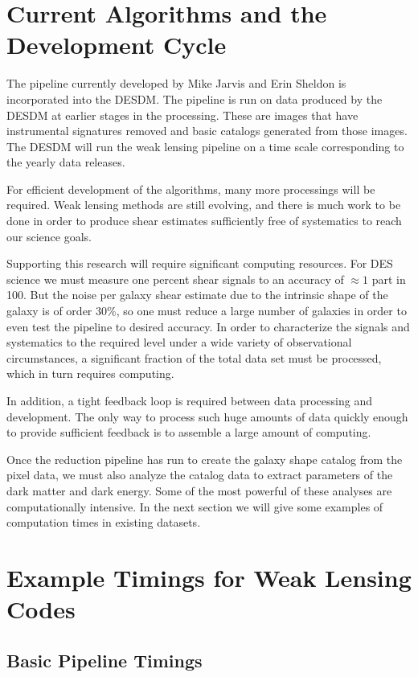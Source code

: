 \documentclass[12pt]{article}
\begin{document}
\section{Current Algorithms and the Development Cycle}

The pipeline currently developed by Mike Jarvis and Erin Sheldon is
incorporated into the DESDM.  The pipeline is run on data produced by the DESDM
at earlier stages in the processing.  These are images that have instrumental
signatures removed and basic catalogs generated from those images.  The DESDM
will run the weak lensing pipeline on a time scale corresponding to the yearly
data releases. 

For efficient development of the algorithms, many more processings will be
required.  Weak lensing methods are still evolving, and there is much
work to be done in order to produce shear estimates sufficiently free of
systematics to reach our science goals.

Supporting this research will require significant computing resources. For DES
science we must measure one percent shear signals to an accuracy of $\approx 1$
part in 100.  But the noise per galaxy shear estimate due to the intrinsic
shape of the galaxy is of order 30\%, so one must reduce a large number of
galaxies in order to even test the pipeline to desired accuracy.  In order to
characterize the signals and systematics to the required level under a wide
variety of observational circumstances, a significant fraction of the total
data set must be processed, which in turn requires computing.

In addition, a tight feedback loop is required between data processing and
development.  The only way to process such huge amounts of data quickly enough
to provide sufficient feedback is to assemble a large amount of computing.

Once the reduction pipeline has run to create the galaxy shape catalog from the
pixel data, we must also analyze the catalog data to extract parameters of the
dark matter and dark energy.   Some of the most powerful of these analyses are
computationally intensive.  In the next section we will give some examples of
computation times in existing datasets.



\section{Example Timings for Weak Lensing Codes}

\subsection{Basic Pipeline Timings}
\end{document}

